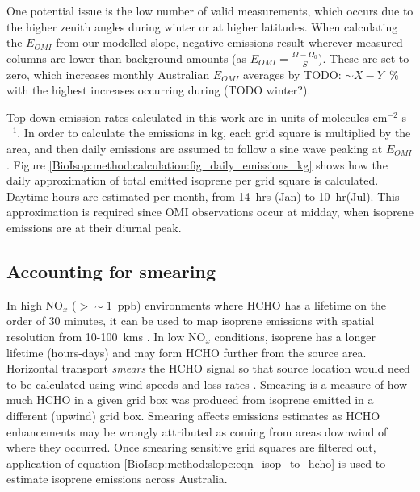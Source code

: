     
    One potential issue is the low number of valid measurements, which occurs due to the higher zenith angles during winter or at higher latitudes.
    When calculating the $E_{OMI}$ from our modelled slope, negative emissions result wherever measured columns are lower than background amounts (as $E_{OMI} = \frac{\Omega - \Omega_0}{S}$).
    These are set to zero, which increases monthly Australian $E_{OMI}$ averages by TODO: $\sim X-Y$~\% with the highest increases occurring during (TODO winter?).
    
    Top-down emission rates calculated in this work are in units of molecules cm$^{-2}$ s$^{-1}$.
    In order to calculate the emissions in kg, each grid square is multiplied by the area, and then daily emissions are assumed to follow a sine wave peaking at $E_{OMI}$.
    Figure \ref{BioIsop:method:calculation:fig_daily_emissions_kg} shows how the daily approximation of total emitted isoprene per grid square is calculated.
    Daytime hours are estimated per month, from 14~hrs (Jan) to 10~hr(Jul).
    This approximation is required since OMI observations occur at midday, when isoprene emissions are at their diurnal peak.
    
  
  
  \subsection{Accounting for smearing}
    \label{BioIsop:method:smearing}
    
    In high NO$_x$ ($ > \sim 1 $~ppb) environments where HCHO has a lifetime on the order of 30 minutes, it can be used to map isoprene emissions with spatial resolution from 10-100~kms \parencite{Palmer2003}.
    In low NO$_x$ conditions, isoprene has a longer lifetime (hours-days) and may form HCHO further from the source area.
    Horizontal transport \textit{smears} the HCHO signal so that source location would need to be calculated using wind speeds and loss rates \parencite{Palmer2001,Palmer2003}.
    Smearing is a measure of how much HCHO in a given grid box was produced from isoprene emitted in a different (upwind) grid box.
    Smearing affects emissions estimates as HCHO enhancements may be wrongly attributed as coming from areas downwind of where they occurred.
    Once smearing sensitive grid squares are filtered out, application of equation \ref{BioIsop:method:slope:eqn_isop_to_hcho} is used to estimate isoprene emissions across Australia.
    
